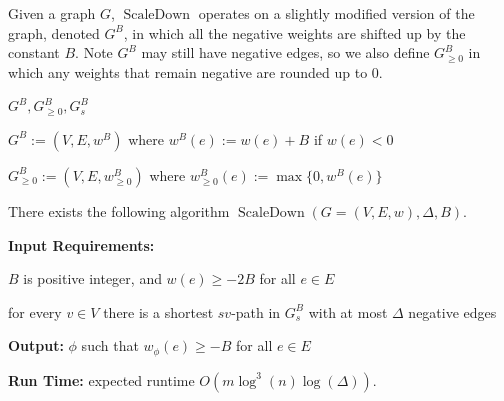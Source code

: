 \documentclass[11pt]{article}
\newcommand{\ScaleDown}{\operatorname{ScaleDown}}
\newcommand{\GB}{G^{B}}
\newcommand{\wB}{w^{B}}
\newenvironment{tight_enumerate}{
\begin{enumerate}
 \setlength{\itemsep}{2pt}
 \setlength{\parskip}{1pt}
}{\end{enumerate}}
\begin{document}
Given a graph $G$, $\ScaleDown$ operates on a slightly modified version of the graph, denoted $\GB$, in which all the negative weights are shifted up by the constant $B$. Note $\GB$ may still have negative edges, so we also define $\GB_{\geq 0}$ in which any weights that remain negative are rounded up to 0.
\begin{definition}{$\GB, \GB_{\geq 0}, \GB_s$}

    $\GB:=(V, E, \wB)$  where $\wB(e) := w(e) + B$ if $w(e) < 0$

    $\GB_{\geq 0}:=(V, E, \wB_{\geq 0})$ where $\wB_{\geq 0}(e) := \max \{0, \wB(e) \}$

\end{definition}


\begin{theorem}[$\ScaleDown$]
\label{thm:scaledown}
There exists the following algorithm $\ScaleDown(G = (V,E,w),\Delta,B)$.
\begin{tight_enumerate}
    \item \textbf{Input Requirements:} \label{item:ScaleDown input}
    \begin{tight_enumerate}
        \item\label{prop:scaledown:weight} $B$ is positive integer, and $w(e) \geq -2B$ for all $e \in E$
        \item\label{prop:scaledown:Delta} 
        for every $v \in V$  
        there is a shortest $sv$-path in $\GB_s$ with at most $\Delta$ negative edges \label{item:ScaleDown input b}
    \end{tight_enumerate}
    \item \label{item:ScaleDown Output} \textbf{Output:} $\phi$ such that $w_{\phi}(e) \geq -B$ for all $e \in E$
    \item \textbf{Run Time:}\label{item:ScaleDown Runtime} expected runtime $O\left(m\log^3(n)\log(\Delta)\right)$.
\end{tight_enumerate}

\end{theorem}
\end{document}

